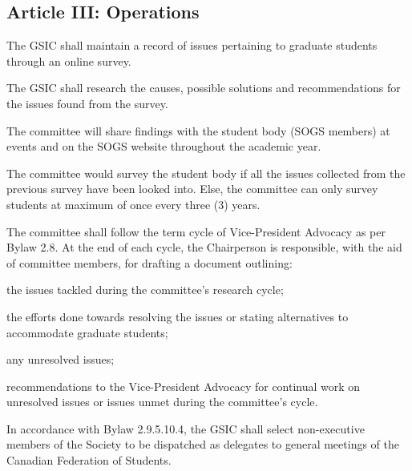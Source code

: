 \subsection{Article III: Operations}
\begin{longenum}[ label*=\thesubsection.\arabic*., align=left] 
\item The GSIC shall maintain a record of issues pertaining to graduate students through an online survey.
\item The GSIC shall research the causes, possible solutions and recommendations for the issues found from the survey.
	\begin{longenum}[ label*=\arabic*., align=left]
	\item The committee will share findings with the student body (SOGS members) at events and on the SOGS website throughout the academic year. 
	\item The committee would survey the student body if all the issues collected from the previous survey have been looked into. Else, the committee can only survey students at maximum of once every three (3) years. 
	\end{longenum}
\item The committee shall follow the term cycle of Vice-President Advocacy as per Bylaw 2.8. At the end of each cycle, the Chairperson is responsible, with the aid of committee members, for drafting a document outlining: 
	\begin{longenum}[ label*=\arabic*., align=left]
	\item the issues tackled during the committee’s research cycle;
	\item the efforts done towards resolving the issues or stating alternatives to accommodate graduate students;
	\item any unresolved issues;
	\item recommendations to the Vice-President Advocacy for continual work on unresolved issues or issues unmet during the committee’s cycle.
	\end{longenum}
\item In accordance with Bylaw 2.9.5.10.4, the GSIC shall select non-executive members of the Society to be dispatched as delegates to general meetings of the Canadian Federation of Students.
\end{longenum}